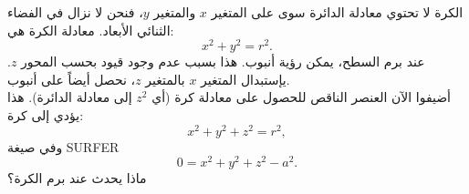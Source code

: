 \begin{surferPage}[كرة]{الكرة}
لا تحتوي معادلة الدائرة سوى على المتغير $x$ والمتغير $y$، فنحن لا نزال في الفضاء الثنائي الأبعاد.
معادلة الكرة هي:
\[x^2+y^2=r^2.\]
عند برم السطح، يمكن رؤية أنبوب. هذا بسبب عدم وجود قيود بحسب المحور $z$. يإستبدال المتغير $x$ بالمتغير $z$، نحصل أيضاً على أنبوب.\\
أضيفوا الآن العنصر الناقص للحصول على معادلة كرة (أي $z^2$ إلى معادلة الدائرة). هذا يؤدي إلى كرة:
\[x^2+y^2+z^2=r^2,\]
وفي صيغة \textenglish{SURFER}
\[0=x^2+y^2+z^2-a^2.\]
ماذا يحدث عند برم الكرة؟
\end{surferPage}
